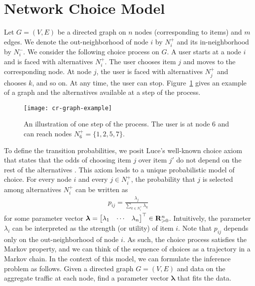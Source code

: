 \section{Network Choice Model}  %
\label{cr:sec:model}

Let $G = (V,E)$ be a directed graph on $n$ nodes (corresponding to items) and $m$ edges.
We denote the out-neighborhood of node $i$ by $N^+_i$ and its in-neighborhood by $N^-_i$.
We consider the following choice process on $G$.
A user starts at a node $i$ and is faced with alternatives $N^+_i$.
The user chooses item $j$ and moves to the corresponding node.
At node $j$, the user is faced with alternatives $N^+_j$ and chooses $k$, and so on.
At any time, the user can stop.
Figure~\ref{cr:fig:samplenet} gives an example of a graph and the alternatives available at a step of the process.

\begin{figure}[t]
  \centering
  \texttt{[image: cr-graph-example]}
  \caption{An illustration of one step of the process.
  The user is at node 6 and can reach nodes $N^+_6 = \{1, 2, 5, 7\}$.}
  \label{cr:fig:samplenet}
\end{figure}

To define the transition probabilities, we posit Luce's well-known choice axiom that states that the odds of choosing item $j$ over item $j'$ do not depend on the rest of the alternatives \citep{luce1959individual}.
This axiom leads to a unique probabilistic model of choice.
For every node $i$ and every $j \in N^+_i$, the probability that $j$ is selected among alternatives $N^+_i$ can be written as
\begin{align}
\label{cr:eq:singlelik}
p_{ij} = \frac{\lambda_j}{\sum_{k \in N^+_i} \lambda_k}
\end{align}
for some parameter vector $\bm{\lambda} = \begin{bmatrix}\lambda_1 & \cdots & \lambda_n \end{bmatrix}^\top \in \mathbf{R}_{>0}^n$.
Intuitively, the parameter $\lambda_i$ can be interpreted as the strength (or utility) of item $i$.
Note that $p_{ij}$ depends only on the out-neighborhood of node $i$.
As such, the choice process satisfies the Markov property, and we can think of the sequence of choices as a trajectory in a Markov chain.
In the context of this model, we can formulate the inference problem as follows.
Given a directed graph $G = (V, E)$ and data on the aggregate traffic at each node, find a parameter vector $\bm{\lambda}$ that fits the data.
